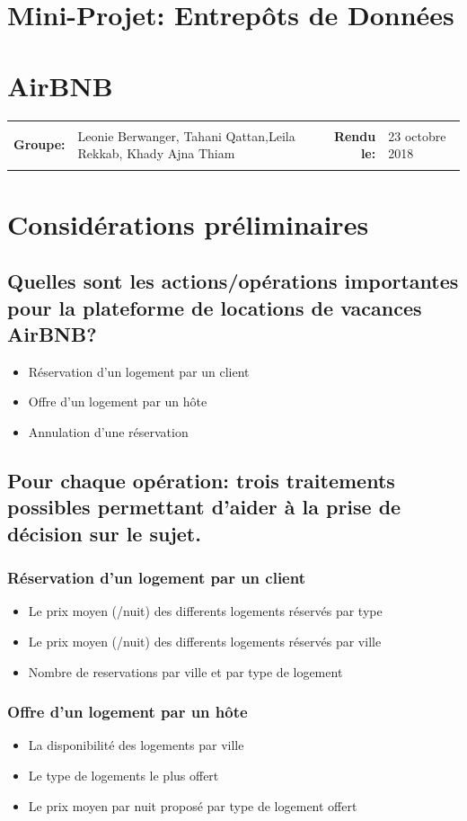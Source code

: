 \documentclass[11pt]{article}
\newcommand{\metaInfo}[4]{
	\begin{tabularx}{\textwidth}{rXrl}
	\hline \\
	\textbf{Groupe:}	& #1 &  \textbf{Rendu le:}   & #2 \\
	\\ \hline
	\end{tabularx}
}
\newcommand{\heading}[2]{
	\begin{center}
	\section*{#1}
	\section*{#2}
	\end{center}
}
\begin{document}
\heading{Mini-Projet: Entrepôts de Données}{AirBNB}
\metaInfo{Leonie Berwanger, Tahani Qattan,\newline Leila Rekkab, Khady Ajna Thiam}{23 octobre 2018}

\section{}
\section{Considérations préliminaires}
\subsection{Quelles sont les actions/opérations importantes pour la plateforme de locations de vacances AirBNB?}
\begin{itemize}
	\item Réservation d'un logement par un client
	\item Offre d'un logement par un hôte
	\item Annulation d'une réservation
\end{itemize}
\subsection{Pour chaque opération: trois traitements possibles permettant d’aider à la prise de décision sur le sujet.}
\subsubsection*{Réservation d'un logement par un client}
\begin{itemize}
	\item Le prix moyen (/nuit) des differents logements réservés par type
	\item Le prix moyen (/nuit) des differents logements réservés par ville
	\item Nombre de reservations par ville et par type de logement
\end{itemize}
\subsubsection*{Offre d'un logement par un hôte}
\begin{itemize}
	\item La disponibilité des logements par ville 
	\item Le type de logements le plus offert 
	\item Le prix moyen par nuit proposé par type de logement offert
\end{itemize}
\end{document}
